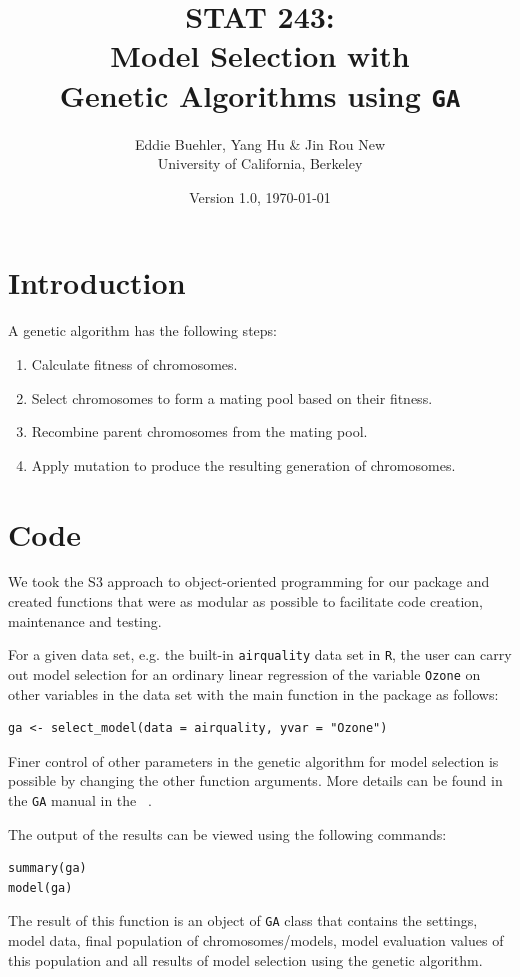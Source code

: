 \documentclass[11pt]{article}
\title{STAT 243: \\
	Model Selection with\\ 
	Genetic Algorithms using \texttt{GA}}
\author{Eddie Buehler, Yang Hu \& Jin Rou New\\
	University of California, Berkeley}
\date{Version 1.0, \today}
\begin{document}
\maketitle

\section{Introduction}
\label{sec:introduction}
A genetic algorithm has the following steps: 
\begin{enumerate}
	\item Calculate fitness of chromosomes.
	\item Select chromosomes to form a mating pool based on their fitness.
	\item Recombine parent chromosomes from the mating pool.
	\item Apply mutation to produce the resulting generation of chromosomes.
\end{enumerate}

\section{Code}
\label{sec:code}
We took the S3 approach to object-oriented programming for our package and created functions that were as modular as possible to facilitate code creation, maintenance and testing.

For a given data set, e.g. the built-in \texttt{airquality} data set in \texttt{R}, the user can carry out model selection for an ordinary linear regression of the variable \texttt{Ozone} on other variables in the data set with the main function in the package as follows:
\begin{verbatim}
ga <- select_model(data = airquality, yvar = "Ozone")
\end{verbatim}

Finer control of other parameters in the genetic algorithm for model selection is possible by changing the other function arguments. More details can be found in the \texttt{GA} manual in the ~.

The output of the results can be viewed using the following commands:
\begin{verbatim}
summary(ga)
model(ga)
\end{verbatim}

The result of this function is an object of \texttt{GA} class that contains the settings, model data, final population of chromosomes/models, model evaluation values of this population and all results of model selection using the genetic algorithm.
\end{document}
